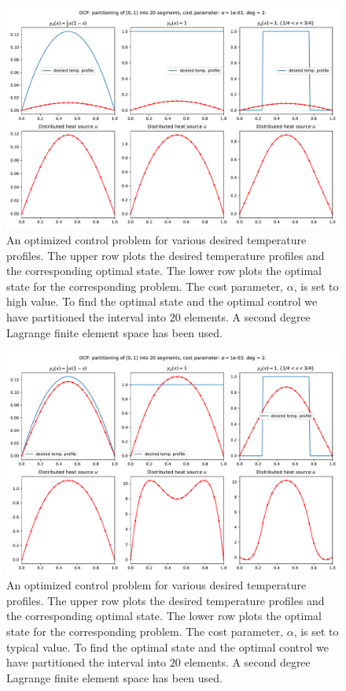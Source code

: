 \begin{figure}
  \centering
  \includegraphics[width=\textwidth]{Images/plots/task2_fig_0.pdf}
  \caption{An optimized control problem for various
    desired temperature profiles. The upper row plots the
    desired temperature profiles and the corresponding 
    optimal state. The lower row plots the
    optimal state for the corresponding problem.
    The cost parameter, $\alpha$, is set to high value.
    To find the optimal state and the optimal control we 
    have partitioned the interval into \( 20 \) elements.
    A second degree Lagrange finite element space has been used.}
  \label{fig:0}
\end{figure}

\begin{figure}
  \centering
  \includegraphics[width=\textwidth]{Images/plots/task2_fig_1.pdf}
  \caption{An optimized control problem for various
    desired temperature profiles. The upper row plots the
    desired temperature profiles and the corresponding 
    optimal state. The lower row plots the
    optimal state for the corresponding problem.
    The cost parameter, $\alpha$, is set to typical value.
    To find the optimal state and the optimal control we 
    have partitioned the interval into \( 20 \) elements.
    A second degree Lagrange finite element space has been used.}
  \label{fig:1}
\end{figure}

